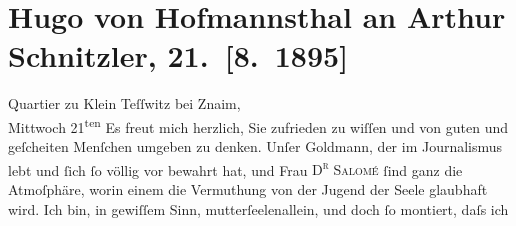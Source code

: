 

         
         \newcommand{\erwaehntePersonen}{Personen: Lou Andreas-Salomé, Paul Goldmann}
         \newcommand{\erwaehnteInstitutionen}{Institutionen: Hoch- und Deutschmeisterkapelle}
         \newcommand{\erwaehnteOrte}{Orte: Dobšice u Znojma, Wien, Znaim, Znojmo}
         \newcommand{\erwaehnteWerke}{Werke: Faust. Eine Tragödie, Wilhelm Meisters Wanderjahre}
               \section[Hugo von Hofmannsthal an Arthur Schnitzler, 21. {[}8. 1895{]}]{ Hugo von Hofmannsthal an Arthur Schnitzler, 21. {[}8. 1895{]}}\nopagebreak{}\rehead{ }\begin{ledgroupsized}[t]{13cm}\normalsize\beginnumbering \toendnotes[C]{\smallbreak\pagebreak[2]} 
\toendnotes[C]{\smallbreak}\pstart
           \raggedleft{}{\pb}Quartier zu Klein Teſſwitz bei Znaim,{\\}Mittwoch 21\textsuperscript{ten}\pend
           \pstart
           Es freut mich herzlich, Sie zufrieden zu wiſſen und von guten und geſcheiten
                    Menſchen umgeben zu denken. Unſer Goldmann,
                    der im Journalismus lebt und ſich ſo völlig vor \textsc{\label{K_L00476_1v}\label{K_L00476_1h}} bewahrt hat, und Frau \textsc{D\textsuperscript{r}{ }Salomé}{ }ſind ganz die Atmoſphäre, worin einem die Vermuthung von der Jugend der
                    Seele glaubhaft wird. Ich bin, in gewiſſem Sinn, mutterſeelenallein, und {\pb}doch ſo montiert, daſs ich

\end{ledgroupsized}
